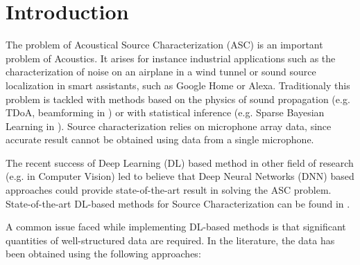 \documentclass[11pt,a4paper,twoside]{report}
\begin{document}
\clearpage

\cleardoublepage

\pagestyle{fancy}
\renewcommand{\chaptermark}[1]{\markboth{#1}{}}
\renewcommand{\sectionmark}[1]{\markright{\thesection\ #1}}
\fancyhead{}

\fancyhead[LO]{\scshape \contentsname}
\fancyhead[RE]{\scshape \contentsname}
\tableofcontents

\cleardoublepage

\setcounter{chapter}{0}
\setcounter{figure}{0}
\fancyhead[LO]{\rightmark}
\fancyhead[RO]{\scshape \chaptername\ \thechapter}
\fancyhead[LE]{\scshape \chaptername\ \thechapter}
\fancyhead[RE]{\textsc{\leftmark}}


\chapter{Introduction}


The problem of Acoustical Source Characterization (ASC) is an important problem  of Acoustics. It arises for instance industrial applications such as the characterization of noise on an airplane in a wind tunnel or sound source localization in smart assistants, such as Google Home or Alexa. Traditionaly this problem is tackled with methods based on the physics of sound propagation (e.g. TDoA, beamforming in \cite{merino2019review}) or with statistical inference (e.g. Sparse Bayesian Learning in \cite{gerstoft2016multisnapshot}). Source characterization relies on microphone array data, since accurate result cannot be obtained using data from a single microphone. 

The recent success of Deep Learning (DL) based method in other field of research (e.g. \cite{ronneberger2015u} in Computer Vision) led to believe that Deep Neural Networks (DNN) based approaches could provide state-of-the-art result in solving the ASC problem. State-of-the-art DL-based methods for Source Characterization can be found in \cite{grumiaux2022survey}.

A common issue faced while implementing DL-based methods is that significant quantities of well-structured data are required. In the literature, the data has been obtained using the following approaches:
\end{document}
